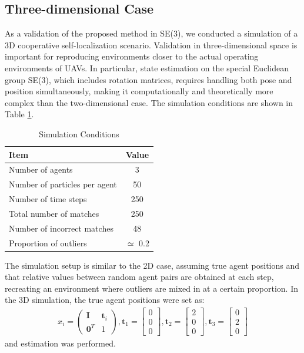 \documentclass[a4paper,fleqn,10pt,twocolumn]{SICE_ISCS}
\begin{document}
\subsection{Three-dimensional Case}

As a validation of the proposed method in SE(3), we conducted a simulation of a 3D cooperative self-localization scenario.
Validation in three-dimensional space is important for reproducing environments closer to the actual operating environments of UAVs.
In particular, state estimation on the special Euclidean group SE(3), which includes rotation matrices, requires handling both pose and position simultaneously, making it computationally and theoretically more complex than the two-dimensional case.
The simulation conditions are shown in Table \ref{tb:sim2}.

\begin{table}[h]
\caption{Simulation Conditions}
  \centering
  \begin{tabular}{l|c} \hline
    Item & Value  \\ \hline
    Number of agents & 3  \\
    Number of particles per agent & 50  \\ 
    Number of time steps & 250 \\
    Total number of matches & 250 \\ 
    Number of incorrect matches & 48 \\
    Proportion of outliers & $\simeq$ 0.2 \\ \hline
  \end{tabular}
  \label{tb:sim2}
\end{table}

The simulation setup is similar to the 2D case, assuming true agent positions and that relative values between random agent pairs are obtained at each step, recreating an environment where outliers are mixed in at a certain proportion.
In the 3D simulation, the true agent positions were set as:
\begin{equation}
  \begin{aligned}
  x_i = 
  \begin{pmatrix}
    {\mathbf{I}} & {\mathbf{t}}_i \\
    {\mathbf{0}}^T & 1
  \end{pmatrix}, {\mathbf{t}}_1 = \begin{bmatrix} 0 \\ 0 \\ 0 \end{bmatrix}, {\mathbf{t}}_2 = \begin{bmatrix} 2 \\ 0 \\ 0 \end{bmatrix}, {\mathbf{t}}_3 = \begin{bmatrix} 0 \\ 2 \\ 0 \end{bmatrix}
  \end{aligned}
\end{equation}
and estimation was performed.
\end{document}
